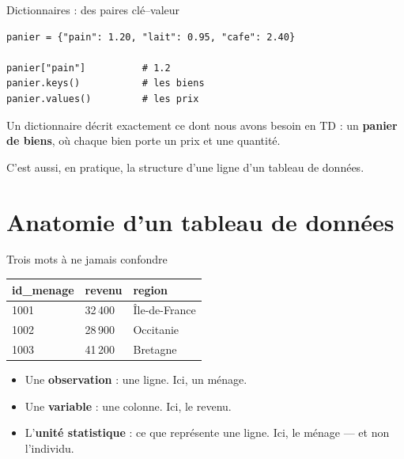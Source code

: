 \documentclass[10pt,aspectratio=169]{beamer}
\begin{document}
\begin{frame}[fragile]{Dictionnaires : des paires clé--valeur}
\begin{lstlisting}
panier = {"pain": 1.20, "lait": 0.95, "cafe": 2.40}

panier["pain"]          # 1.2
panier.keys()           # les biens
panier.values()         # les prix
\end{lstlisting}

\vspace{1.2em}
Un dictionnaire décrit exactement ce dont nous avons besoin en TD : un \textbf{panier de biens}, où chaque bien porte un prix et une quantité.

\vspace{0.8em}
C'est aussi, en pratique, la structure d'une ligne d'un tableau de données.
\end{frame}

\section{Anatomie d'un tableau de données}

\begin{frame}{Trois mots à ne jamais confondre}
\begin{center}
\begin{tabular}{lll}
\toprule
\textbf{id\_menage} & \textbf{revenu} & \textbf{region} \\
\midrule
1001 & 32\,400 & Île-de-France \\
1002 & 28\,900 & Occitanie \\
1003 & 41\,200 & Bretagne \\
\bottomrule
\end{tabular}
\end{center}

\vspace{1.5em}
\begin{itemize}
  \item Une \textbf{observation} : une ligne. Ici, un ménage.
  \item Une \textbf{variable} : une colonne. Ici, le revenu.
  \item L'\textbf{unité statistique} : ce que représente une ligne. Ici, le ménage --- et non l'individu.
\end{itemize}
\end{frame}
\end{document}
